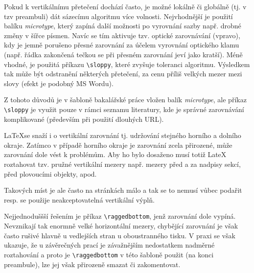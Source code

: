 Pokud k vertikálnímu přetečení dochází často, je možné lokálně či globálně (tj. v tzv preambuli) dát sázecímu algoritmu více volnosti. Nejvhodnější je použití balíku \textit{microtype}, který zapíná další možnosti po vyrovnání sazby např. drobné změny v šířce písmen. Navíc se tím aktivuje tzv. optické zarovnávání (vpravo), kdy je jemně porušeno přesné zarovnání za účelem vyrovnání optického klamu (např. řádka zakončená tečkou se při přesném zarovnání jeví jako kratší). Méně vhodné, je použitá příkazu \verb!\sloppy!, které zvyšuje toleranci algoritmu. Výsledkem tak může být odstranění některých přetečení, za cenu příliš velkých mezer mezi slovy (efekt je podobný MS Wordu).

Z tohoto důvodů je v šabloně bakalářské práce vložen balík  \textit{microtype}, ale příkaz \verb!\sloppy! je využit pouze v rámci seznamu literatury, kde je správné zarovnávání komplikované (především při použití dlouhých URL).

\LaTeX se snaží i o vertikální zarovnání tj. udržování stejného horního a dolního okraje. Zatímco v případě horního okraje je zarovnání zcela přirozené, může zarovnání dole vést k problémům. Aby ho bylo dosaženo musí totiž LateX roztahovat tzv. pružné vertikální mezery např. mezery před a za nadpisy sekcí, před plovoucími objekty, apod.

Takových míst je ale často na stránkách málo a tak se to nemusí vůbec podařit resp. se použije neakceptovatelná vertikální výplň. 

Nejjednoduššší řešením je příkaz \verb!\raggedbottom!, jenž zarovnání dole vypíná. Nevznikají tak enormně velké horizontální mezery, chybějící zarovnání je však často rušivé hlavně u vedlejších
stran u oboustranného tisku. V praxi se však ukazuje, že u závěrečných prací  je závažnějším nedostatkem nadměrné roztahování a proto je \verb!\raggedbottom! v této šabloně použit (na konci preambule), lze jej však přirozeně smazat či zakomentovat.